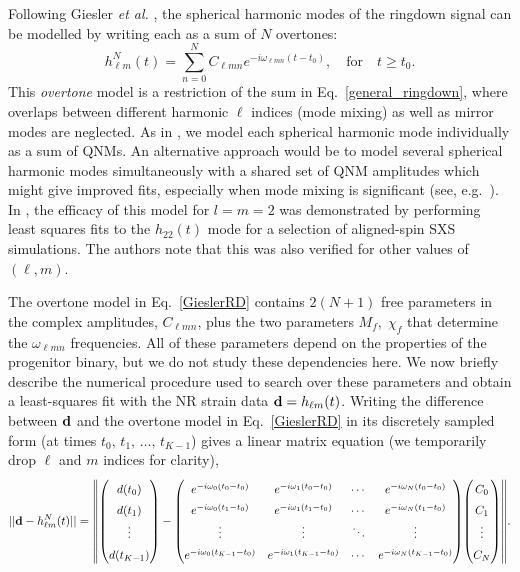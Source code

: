 Following Giesler \emph{et al.} \cite{overtones}, the spherical harmonic modes of the ringdown signal can be modelled by writing each as a sum of $N$ overtones:
\begin{equation}\label{GieslerRD}
    h_{\ell m}^N(t) = \sum_{n=0}^N C_{\ell m n} e^{-i\omega_{\ell m n}(t-t_0)}, \quad \textrm{for} \quad t \geq t_0.
\end{equation}
This \emph{overtone} model is a restriction of the sum in Eq.~\ref{general_ringdown}, where overlaps between different harmonic $\ell$ indices (mode mixing) \cite{2014PhRvD..90f4012B} as well as mirror modes are neglected. 
As in \cite{overtones}, we model each spherical harmonic mode individually as a sum of QNMs. An alternative approach would be to model several spherical harmonic modes simultaneously with a shared set of QNM amplitudes which might give improved fits, especially when mode mixing is significant (see, e.g.\ \cite{2020PhRvD.102b4027C}).
In \cite{overtones}, the efficacy of this model for $l=m=2$ was demonstrated by performing least squares fits to the $h_{22}(t)$ mode for a selection of aligned-spin SXS simulations. The authors note that this was also verified for other values of $(\ell,m)$.

The overtone model in Eq.~\ref{GieslerRD} contains $2(N+1)$ free parameters in the complex amplitudes, $C_{\ell m n}$, plus the two parameters $M_f,\; \chi_f$ that determine the $\omega_{\ell m n}$ frequencies.
All of these parameters depend on the properties of the progenitor binary, but we do not study these dependencies here.
We now briefly describe the numerical procedure used to search over these parameters and obtain a least-squares fit with the NR strain data $\vb{d}=h_{\ell m}(t)$.
Writing the difference between $\vb{d}$ and the overtone model in Eq.~\ref{GieslerRD} in its discretely sampled form (at times $t_0,\, t_1,\, \dots,\, t_{K-1}$) gives a linear matrix equation (we temporarily drop $\ell$ and $m$ indices for clarity),
\begin{equation}\label{eq:linalg_fit}
\renewcommand*{\arraystretch}{1.5}
    ||\vb{d}-h^{N}_{\ell m}(t)|| = \norm{\mqty(d(t_0) \\ d(t_1) \\ \vdots \\ d(t_{K-1})) - 
    \mqty(e^{-i\omega_0(t_0-t_0)} & e^{-i\omega_1(t_0-t_0)} & \cdots & e^{-i\omega_N(t_0-t_0)} \\ 
          e^{-i\omega_0(t_1-t_0)} & e^{-i\omega_1(t_1-t_0)} & \cdots & e^{-i\omega_N(t_1-t_0)} \\ 
          \vdots & \vdots & \ddots & \vdots \\ 
          e^{-i\omega_0(t_{K-1}-t_0)} & e^{-i\omega_1(t_{K-1}-t_0)} & \cdots & e^{-i\omega_N(t_{K-1}-t_0)}) 
    \mqty(C_0 \\ C_1 \\ \vdots \\ C_N)}.
\end{equation}

